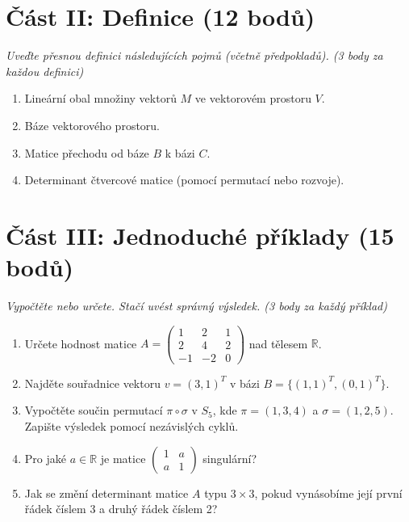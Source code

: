 \documentclass[a4paper,11pt]{article}
\begin{document}
\vspace{0.5cm}

\section*{Část II: Definice (12 bodů)}
\textit{Uveďte přesnou definici následujících pojmů (včetně předpokladů). (3 body za každou definici)}

\begin{enumerate}
    \item Lineární obal množiny vektorů $M$ ve vektorovém prostoru $V$.
    \item Báze vektorového prostoru.
    \item Matice přechodu od báze $B$ k bázi $C$.
    \item Determinant čtvercové matice (pomocí permutací nebo rozvoje).
\end{enumerate}

\vspace{0.5cm}

\section*{Část III: Jednoduché příklady (15 bodů)}
\textit{Vypočtěte nebo určete. Stačí uvést správný výsledek. (3 body za každý příklad)}

\begin{enumerate}
    \item Určete hodnost matice $A = \begin{pmatrix} 1 & 2 & 1 \\ 2 & 4 & 2 \\ -1 & -2 & 0 \end{pmatrix}$ nad tělesem $\mathbb{R}$.
    \item Najděte souřadnice vektoru $v = (3, 1)^T$ v bázi $B = \{ (1, 1)^T, (0, 1)^T \}$.
    \item Vypočtěte součin permutací $\pi \circ \sigma$ v $S_5$, kde $\pi = (1, 3, 4)$ a $\sigma = (1, 2, 5)$. Zapište výsledek pomocí nezávislých cyklů.
    \item Pro jaké $a \in \mathbb{R}$ je matice $\begin{pmatrix} 1 & a \\ a & 1 \end{pmatrix}$ singulární?
    \item Jak se změní determinant matice $A$ typu $3 \times 3$, pokud vynásobíme její první řádek číslem 3 a druhý řádek číslem 2?
\end{enumerate}
\end{document}
